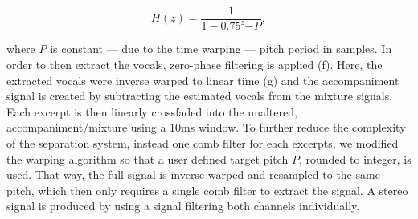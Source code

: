 \begin{equation}
  H(z) = \frac{1}{1 - 0.75^z{-P}},
\end{equation}

where \(P\) is constant --- due to the time warping --- pitch period in samples.
In order to then extract the vocals, zero-phase filtering is applied (f).
Here, the extracted vocals were inverse warped to linear time (g) and the accompaniment signal is created by subtracting the estimated vocals from the mixture signals.
Each excerpt is then linearly crossfaded into the unaltered, accompaniment/mixture using a 10ms window.
To further reduce the complexity of the separation system, instead one comb filter for each excerpts, we modified the warping algorithm so that a user defined target pitch \(P\), rounded to integer, is used.
That way, the full signal is inverse warped and resampled to the same pitch, which then only requires a single comb filter to extract the signal.
A stereo signal is produced by using a signal filtering both channels individually.

